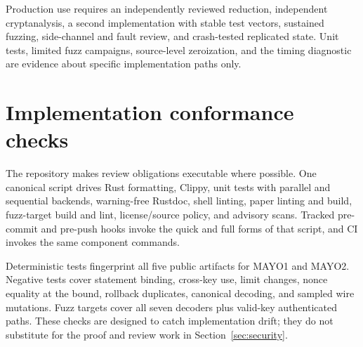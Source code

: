 \documentclass[11pt]{article}
\theoremstyle{remark}
\begin{document}
Production use requires an independently reviewed reduction, independent
cryptanalysis, a second implementation with stable test vectors, sustained
fuzzing, side-channel and fault review, and crash-tested replicated state.
Unit tests, limited fuzz campaigns, source-level zeroization, and the timing
diagnostic are evidence about specific implementation paths only.

\section{Implementation conformance checks}

The repository makes review obligations executable where possible. One
canonical script drives Rust formatting, Clippy, unit tests with parallel and
sequential backends, warning-free Rustdoc, shell linting, paper linting and
build, fuzz-target build and lint, license/source policy, and advisory scans.
Tracked pre-commit and pre-push hooks invoke the quick and full forms of that
script, and CI invokes the same component commands.

Deterministic tests fingerprint all five public artifacts for MAYO1 and
MAYO2. Negative tests cover statement binding, cross-key use, limit changes,
nonce equality at the bound, rollback duplicates, canonical decoding, and
sampled wire mutations. Fuzz targets cover all seven decoders plus valid-key
authenticated paths. These checks are designed to catch implementation drift;
they do not substitute for the proof and review work in
Section~\ref{sec:security}.



\end{document}
